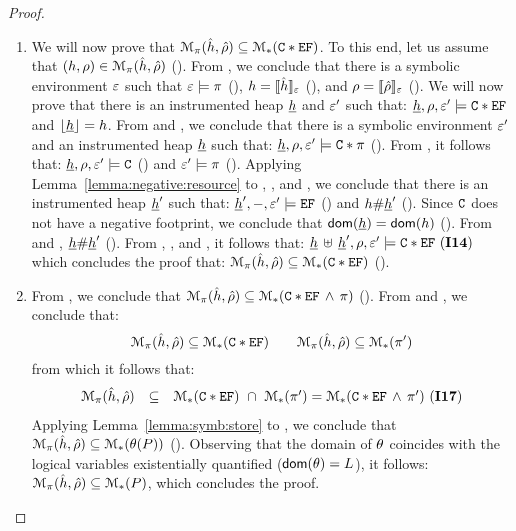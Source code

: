 \begin{proof}
\begin{enumerate}
\item We will now prove that  $\mathcal{M}_{\pi}(\hat{h}, \hat\rho) \subseteq \mathcal{M}_{*}(\mathtt{C} \mathbin{*} \mathtt{EF})$. 
To this end, let us assume that $(h, \rho) \in \mathcal{M}_{\pi}(\hat{h}, \hat\rho)$ (). 
From , we conclude that there is a symbolic environment $\varepsilon$ such that $\varepsilon \models \pi$ (), 
$h = \llbracket \hat{h} \rrbracket_{\varepsilon}$ (), and $\rho = \llbracket \hat\rho \rrbracket_{\varepsilon}$ ().
We will now prove that there is an instrumented heap $\underline{h}$  and $\varepsilon'$ such 
that: $\underline{h}, \rho, \varepsilon' \models \mathtt{C} \mathbin{*} \mathtt{EF}$ and $\lfloor \underline{h} \rfloor = h$. 
From  and , we conclude that there is a symbolic environment $\varepsilon'$ and 
an instrumented heap $\underline{h}$ such that: $\underline{h}, \rho, \varepsilon' \models \mathtt{C} \mathbin{*} \pi$ (). 
From , it follows that: $\underline{h}, \rho, \varepsilon' \models \mathtt{C}$ () and $\varepsilon' \models \pi$ ().
Applying Lemma~\ref{lemma:negative:resource} to , , and , we conclude that 
there is an instrumented heap $\underline{h}'$ such that: $\underline{h}', -, \varepsilon' \models \mathtt{EF}$ () 
and $h \# \underline{h}'$ (). 
Since $\mathtt{C}$ does not have a negative footprint, we conclude that $\mathsf{dom}(\underline{h}) = \mathsf{dom}(h)$ (). 
From  and , $\underline{h} \# \underline{h}'$ (). 
From , , and , it follows that: 
$
\underline{h} \, \uplus \, \underline{h}', \rho, \varepsilon' \models \mathtt{C} \mathbin{*} \mathtt{EF} \text{ ({\bf I14})}
$  
which concludes the proof that: $\mathcal{M}_{\pi}(\hat{h}, \hat\rho) \subseteq \mathcal{M}_{*}(\mathtt{C} \mathbin{*} \mathtt{EF})$ (). 
\vspace{4pt}

\item From , we conclude that $\mathcal{M}_{\pi}(\hat{h}, \hat\rho) \subseteq \mathcal{M}_{*}(\mathtt{C} \mathbin{*} \mathtt{EF} \, \wedge \, \pi)$ (). 
From  and , we conclude that: 
$$
  \mathcal{M}_{\pi}(\hat{h}, \hat\rho) \subseteq \mathcal{M}_{*}(\mathtt{C} \mathbin{*} \mathtt{EF})  
  \qquad 
   \mathcal{M}_{\pi}(\hat{h}, \hat\rho) \subseteq \mathcal{M}_{*}(\pi')  
$$
from which it follows that: 
$$ 
 \begin{array}{lcl}
  \mathcal{M}_{\pi}(\hat{h}, \hat\rho) 
           & \subseteq & 
             \mathcal{M}_{*}(\mathtt{C} \mathbin{*} \mathtt{EF}) \ \cap \ \mathcal{M}_{*}(\pi')  = 
             \mathcal{M}_{*}(\mathtt{C} \mathbin{*} \mathtt{EF} \, \wedge \, \pi') \text{ ({\bf I17})}
 \end{array}
$$ 
Applying Lemma~\ref{lemma:symb:store} to , we conclude that 
$\mathcal{M}_{\pi}(\hat{h}, \hat\rho) \subseteq \mathcal{M}_{*}(\theta(P))$ ().
Observing that the domain of $\theta$ coincides with the logical variables existentially quantified ($\mathsf{dom}(\theta) = L$), 
it follows: $\mathcal{M}_{\pi}(\hat{h}, \hat\rho)  \subseteq \mathcal{M}_{*}(P)$, which concludes the proof. 
\end{enumerate}
\end{proof}


